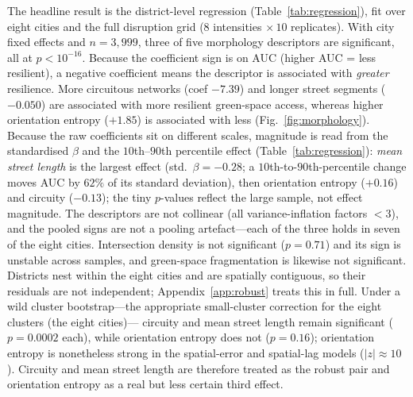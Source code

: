 \documentclass[sn-mathphys-num,pdflatex]{sn-jnl}
\begin{document}
The headline result is the district-level regression (Table~\ref{tab:regression}),
fit over eight cities and the full disruption grid ($8$ intensities $\times\,10$
replicates). With city fixed effects and $n=3{,}999$, three of five morphology
descriptors are significant, all at $p<10^{-16}$. Because the coefficient sign is on
AUC (higher AUC = less resilient), a negative coefficient means the descriptor is
associated with \emph{greater} resilience. More circuitous networks (coef $-7.39$)
and longer street segments ($-0.050$) are associated with more resilient green-space
access, whereas higher orientation entropy ($+1.85$) is associated with less
(Fig.~\ref{fig:morphology}). Because the raw coefficients sit on different scales, magnitude is
read from the standardised $\beta$ and the $10$th--$90$th percentile effect
(Table~\ref{tab:regression}): \emph{mean street length} is the largest effect (std.\
$\beta=-0.28$; a $10$th-to-$90$th-percentile change moves AUC by $62\%$ of its
standard deviation), then orientation entropy ($+0.16$) and circuity ($-0.13$); the
tiny $p$-values reflect the large sample, not effect magnitude. The descriptors are
not collinear (all variance-inflation factors $<3$), and the pooled signs are not a
pooling artefact---each of the three holds in seven of the eight cities. Intersection
density is not significant ($p=0.71$) and its sign is unstable across samples, and
green-space fragmentation is likewise not significant. Districts nest within the eight
cities and are spatially contiguous, so their residuals are not independent;
Appendix~\ref{app:robust} treats this in full. Under a wild cluster bootstrap---the
appropriate small-cluster correction for the eight clusters (the eight cities)---
circuity and mean street length remain significant ($p=0.0002$ each), while
orientation entropy does not ($p=0.16$); orientation entropy is nonetheless strong in
the spatial-error and spatial-lag models ($|z|\approx10$). Circuity
and mean street length are therefore treated as the robust pair and orientation entropy as a real but
less certain third effect.
\end{document}
